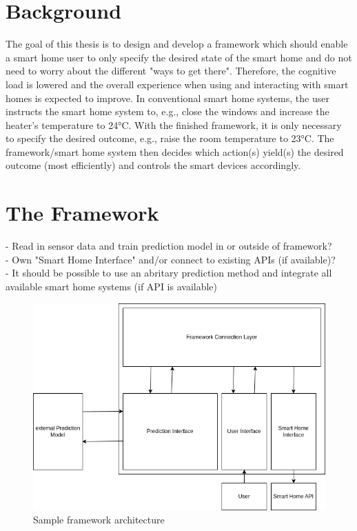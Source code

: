 \documentclass[a4paper,11pt]{article}
\begin{document}
\section{Background}
The goal of this thesis is to design and develop a framework which should enable a smart home user to only specify the desired state of the smart home and do not need to worry about the different "ways to get there".
Therefore, the cognitive load is lowered and the overall experience when using and interacting with smart homes is expected to improve.
In conventional smart home systems, the user instructs the smart home system to, e.g., close the windows and increase the heater's temperature to 24°C.
With the finished framework, it is only necessary to specify the desired outcome, e.g., raise the room temperature to 23°C.
The framework/smart home system then decides which action(s) yield(s) the desired outcome (most efficiently) and controls the smart devices accordingly.


\section{The Framework}
- Read in sensor data and train prediction model in or outside of framework? \\
- Own "Smart Home Interface" and/or connect to existing APIs (if available)? \\
- It should be possible to use an abritary prediction method and integrate all available smart home systems (if API is available) \\
\begin{figure}[h!]
   \centering
   \includegraphics[width=.75\textwidth]{fw-architecture.png} 
   \caption{Sample framework architecture}
\end{figure}
\end{document}
